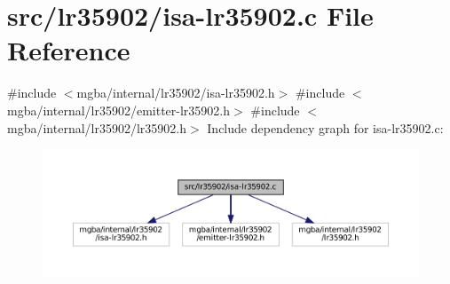 \hypertarget{isa-lr35902_8c}{}\section{src/lr35902/isa-\/lr35902.c File Reference}
\label{isa-lr35902_8c}
{\ttfamily \#include $<$mgba/internal/lr35902/isa-\/lr35902.\+h$>$}\newline
{\ttfamily \#include $<$mgba/internal/lr35902/emitter-\/lr35902.\+h$>$}\newline
{\ttfamily \#include $<$mgba/internal/lr35902/lr35902.\+h$>$}\newline
Include dependency graph for isa-\/lr35902.c\+:
\nopagebreak
\begin{figure}[H]
\begin{center}
\leavevmode
\includegraphics[width=350pt]{isa-lr35902_8c__incl}
\end{center}
\end{figure}
